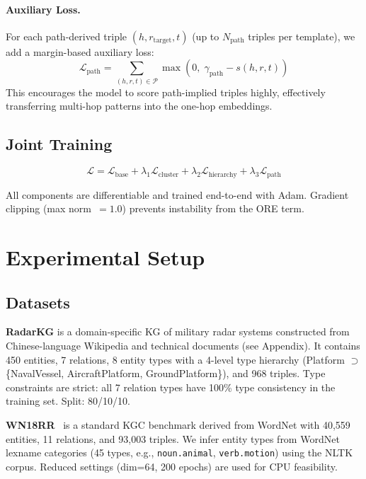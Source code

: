 \documentclass[10pt,twocolumn]{article}
\begin{document}
\paragraph{Auxiliary Loss.}
For each path-derived triple $(h, r_{\text{target}}, t)$ (up to $N_{\text{path}}$
triples per template), we add a margin-based auxiliary loss:
\[
  \mathcal{L}_{\text{path}} = \sum_{(h,r,t) \in \mathcal{P}}
  \max\!\left(0,\; \gamma_{\text{path}} - s(h, r, t)\right)
\]
This encourages the model to score path-implied triples highly, effectively
transferring multi-hop patterns into the one-hop embeddings.

\subsection{Joint Training}

\[
  \mathcal{L} = \mathcal{L}_{\text{base}}
  + \lambda_1 \mathcal{L}_{\text{cluster}}
  + \lambda_2 \mathcal{L}_{\text{hierarchy}}
  + \lambda_3 \mathcal{L}_{\text{path}}
\]

All components are differentiable and trained end-to-end with Adam.
Gradient clipping (max norm~$= 1.0$) prevents instability from the ORE term.

\section{Experimental Setup}

\subsection{Datasets}

\textbf{RadarKG} is a domain-specific KG of military radar systems constructed
from Chinese-language Wikipedia and technical documents (see Appendix).
It contains 450 entities, 7 relations, 8 entity types with a 4-level type hierarchy
(Platform $\supset$ \{NavalVessel, AircraftPlatform, GroundPlatform\}), and 968
triples. Type constraints are strict: all 7 relation types have 100\% type
consistency in the training set. Split: 80/10/10.

\textbf{WN18RR}~\cite{dettmers2018convolutional} is a standard KGC benchmark
derived from WordNet with 40,559 entities, 11 relations, and 93,003 triples.
We infer entity types from WordNet lexname categories (45 types, e.g.,
\texttt{noun.animal}, \texttt{verb.motion}) using the NLTK corpus.
Reduced settings (dim=64, 200 epochs) are used for CPU feasibility.
\end{document}
